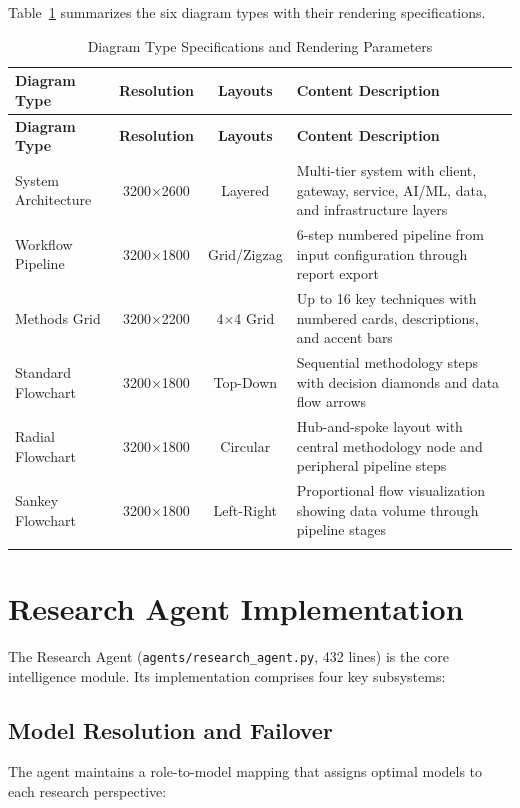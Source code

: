 \documentclass[a4paper,12pt,openany]{report}
\begin{document}
Table~\ref{tab:diagram_types} summarizes the six diagram types with their rendering specifications.

\begin{longtable}{|p{2.8cm}|c|c|p{6cm}|}
\hline
\textbf{Diagram Type} & \textbf{Resolution} & \textbf{Layouts} & \textbf{Content Description} \\
\hline
\endfirsthead
\hline
\textbf{Diagram Type} & \textbf{Resolution} & \textbf{Layouts} & \textbf{Content Description} \\
\hline
\endhead
\hline
\endfoot
System Architecture & 3200$\times$2600 & Layered & Multi-tier system with client, gateway, service, AI/ML, data, and infrastructure layers \\
\hline
Workflow Pipeline & 3200$\times$1800 & Grid/Zigzag & 6-step numbered pipeline from input configuration through report export \\
\hline
Methods Grid & 3200$\times$2200 & 4$\times$4 Grid & Up to 16 key techniques with numbered cards, descriptions, and accent bars \\
\hline
Standard Flowchart & 3200$\times$1800 & Top-Down & Sequential methodology steps with decision diamonds and data flow arrows \\
\hline
Radial Flowchart & 3200$\times$1800 & Circular & Hub-and-spoke layout with central methodology node and peripheral pipeline steps \\
\hline
Sankey Flowchart & 3200$\times$1800 & Left-Right & Proportional flow visualization showing data volume through pipeline stages \\
\hline

\caption{Diagram Type Specifications and Rendering Parameters}
\label{tab:diagram_types}
\end{longtable}

\section{Research Agent Implementation}

The Research Agent (\texttt{agents/research\_agent.py}, 432 lines) is the core intelligence module. Its implementation comprises four key subsystems:

\subsection{Model Resolution and Failover}

The agent maintains a role-to-model mapping that assigns optimal models to each research perspective:
\end{document}
